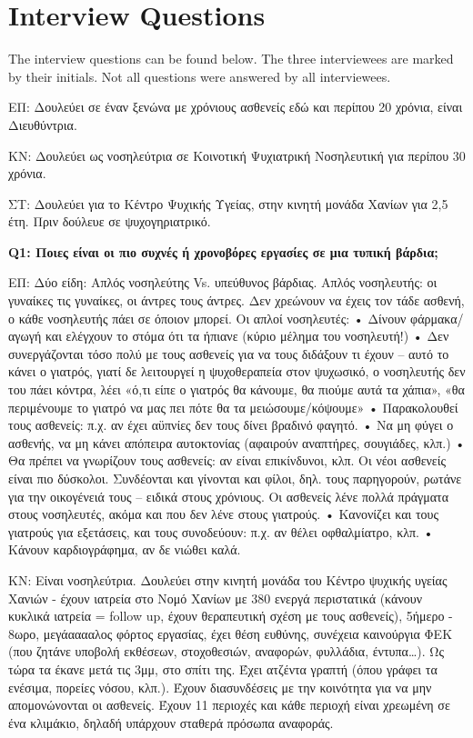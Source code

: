 
\chapter{Interview Questions}\label{sec:interview}
The interview questions can be found below. The three interviewees are marked by their initials. Not all questions were answered by all interviewees.

ΕΠ: Δουλεύει σε έναν ξενώνα με χρόνιους ασθενείς εδώ και περίπου 20 χρόνια, είναι Διευθύντρια. 

ΚΝ: Δουλεύει ως νοσηλεύτρια σε Κοινοτική Ψυχιατρική Νοσηλευτική για περίπου 30 χρόνια.

ΣΤ: Δουλεύει για το Κέντρο Ψυχικής Υγείας, στην κινητή μονάδα Χανίων για 2,5 έτη. Πριν δούλευε σε ψυχογηριατρικό.


\textbf{Q1:	Ποιες είναι οι πιο συχνές ή χρονοβόρες εργασίες σε μια τυπική βάρδια;}

ΕΠ: Δύο είδη: Απλός νοσηλεύτης Vs. υπεύθυνος βάρδιας. 
Απλός νοσηλευτής: οι γυναίκες τις γυναίκες, οι άντρες τους άντρες.
Δεν χρεώνουν να έχεις τον τάδε ασθενή, ο κάθε νοσηλευτής πάει σε όποιον μπορεί.
Οι απλοί νοσηλευτές:
•	Δίνουν φάρμακα/αγωγή και ελέγχουν το στόμα ότι τα ήπιανε (κύριο μέλημα του νοσηλευτή!)
•	Δεν συνεργάζονται τόσο πολύ με τους ασθενείς για να τους διδάξουν τι έχουν – αυτό το κάνει ο γιατρός, γιατί δε λειτουργεί η ψυχοθεραπεία στον ψυχωσικό, ο νοσηλευτής δεν του πάει κόντρα, λέει «ό,τι είπε ο γιατρός θα κάνουμε, θα πιούμε αυτά τα χάπια», «θα περιμένουμε το γιατρό να μας πει πότε θα τα μειώσουμε/κόψουμε»
•	Παρακολουθεί τους ασθενείς: π.χ. αν έχει αϋπνίες δεν τους δίνει βραδινό φαγητό.
•	Να μη φύγει ο ασθενής, να μη κάνει απόπειρα αυτοκτονίας (αφαιρούν αναπτήρες, σουγιάδες, κλπ.)
•	Θα πρέπει να γνωρίζουν τους ασθενείς: αν είναι επικίνδυνοι, κλπ. Οι νέοι ασθενείς είναι πιο δύσκολοι. Συνδέονται και γίνονται και φίλοι, δηλ. τους παρηγορούν, ρωτάνε για την οικογένειά τους – ειδικά στους χρόνιους. Οι ασθενείς λένε πολλά πράγματα στους νοσηλευτές, ακόμα και που δεν λένε στους γιατρούς.
• Κανονίζει και τους γιατρούς για εξετάσεις, και τους συνοδεύουν: π.χ. αν θέλει οφθαλμίατρο, κλπ.
• Κάνουν καρδιογράφημα, αν δε νιώθει καλά.

ΚΝ: Είναι νοσηλεύτρια. Δουλεύει στην κινητή μονάδα του Κέντρο ψυχικής υγείας Χανιών - έχουν ιατρεία στο Νομό Χανίων με 380 ενεργά περιστατικά (κάνουν κυκλικά ιατρεία = follow up, έχουν θεραπευτική σχέση με τους ασθενείς), 5ήμερο - 8ωρο, μεγάααααλος φόρτος εργασίας, έχει θέση ευθύνης, συνέχεια καινούργια ΦΕΚ (που ζητάνε υποβολή εκθέσεων, στοχοθεσιών, αναφορών, φυλλάδια, έντυπα…). Ως τώρα τα έκανε μετά τις 3μμ, στο σπίτι της. Έχει ατζέντα γραπτή (όπου γράφει τα ενέσιμα, πορείες νόσου, κλπ.). Έχουν διασυνδέσεις με την κοινότητα για να μην απομονώνονται οι ασθενείς. Έχουν 11 περιοχές και κάθε περιοχή είναι χρεωμένη σε ένα κλιμάκιο, δηλαδή υπάρχουν σταθερά πρόσωπα αναφοράς.

